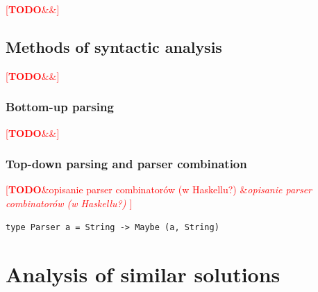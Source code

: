 \documentclass[english,engineering]{wizthesis}
\newcommand{\todo}[1]{%
  \textcolor{red}{[\textbf{TODO}\ifx&#1&{}\else{ }\fi\emph{#1}]}%
}
\begin{document}
\todo{}

\section{Methods of syntactic analysis} \label{sec:parsing}

\todo{\cite{aho-2019}}

\subsection{Bottom-up parsing}

\todo{}

\subsection{Top-down parsing and parser combination}

\todo{opisanie parser combinatorów (w Haskellu?) \cite{swierstra-2009}
\cite{leijen-2001} \cite{fokker-1995}}

\begin{verbatim}
type Parser a = String -> Maybe (a, String)
\end{verbatim}




\chapter{Analysis of similar solutions}



\end{document}
